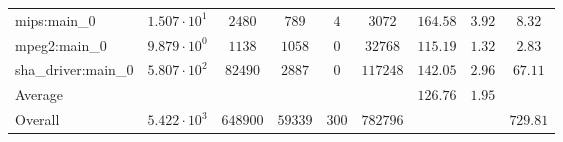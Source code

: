\begin{tabular}{|l|c|c|c|c|c|c|c|c|}
mips:main\_0            & $ 1.507 \cdot 10^{1}  $ & $ 2480   $ & $ 789   $ & $ 4   $ & $ 3072   $ & $ 164.58      $ & $ 3.92    $ & $ 8.32    $ \\
mpeg2:main\_0           & $ 9.879 \cdot 10^{0}  $ & $ 1138   $ & $ 1058  $ & $ 0   $ & $ 32768  $ & $ 115.19      $ & $ 1.32    $ & $ 2.83    $ \\
sha\_driver:main\_0     & $ 5.807 \cdot 10^{2}  $ & $ 82490  $ & $ 2887  $ & $ 0   $ & $ 117248 $ & $ 142.05      $ & $ 2.96    $ & $ 67.11   $ \\
\hline
Average                 & $                     $ & $        $ & $       $ & $     $ & $        $ & $ 126.76      $ & $ 1.95    $ & $         $ \\
\hline
Overall                 & $ 5.422 \cdot 10^{3}  $ & $ 648900 $ & $ 59339 $ & $ 300 $ & $ 782796 $ & $             $ & $         $ & $ 729.81  $ \\
\hline
\end{tabular}
